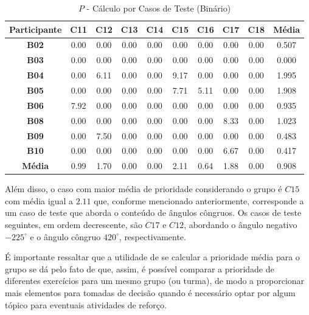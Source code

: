 \begin{table}[htbp]
	\centering
	\caption{$P$ - Cálculo por Casos de Teste (Binário)}
	\begin{tabular}{|c|c|c|c|c|c|c|c|c|c|}
		\hline
		\rowcolor[HTML]{D9D9D9} 
		\cellcolor[HTML]{D0CECE}\textbf{Participante} & \textbf{C11} & \textbf{C12} & \textbf{C13} & \textbf{C14} & \textbf{C15} & \textbf{C16} & \textbf{C17} & \textbf{C18} & \textbf{Média} \\ \hline
		\textbf{B02} & 0.00 & 0.00 & 0.00 & 0.00 & 0.00 & 0.00 & 0.00 & 0.00 & 0.507 \\ \hline
		\rowcolor[HTML]{F2F2F2} 
		\textbf{B03} & 0.00 & 0.00 & 0.00 & 0.00 & 0.00 & 0.00 & 0.00 & 0.00 & 0.000 \\ \hline
		\textbf{B04} & 0.00 & 6.11 & 0.00 & 0.00 & 9.17 & 0.00 & 0.00 & 0.00 & 1.995 \\ \hline
		\rowcolor[HTML]{F2F2F2} 
		\textbf{B05} & 0.00 & 0.00 & 0.00 & 0.00 & 7.71 & 5.11 & 0.00 & 0.00 & 1.908 \\ \hline
		\textbf{B06} & 7.92 & 0.00 & 0.00 & 0.00 & 0.00 & 0.00 & 0.00 & 0.00 & 0.935 \\ \hline
		\rowcolor[HTML]{F2F2F2} 
		\textbf{B08} & 0.00 & 0.00 & 0.00 & 0.00 & 0.00 & 0.00 & 8.33 & 0.00 & 1.023 \\ \hline
		\textbf{B09} & 0.00 & 7.50 & 0.00 & 0.00 & 0.00 & 0.00 & 0.00 & 0.00 & 0.483 \\ \hline
		\rowcolor[HTML]{F2F2F2} 
		\textbf{B10} & 0.00 & 0.00 & 0.00 & 0.00 & 0.00 & 0.00 & 6.67 & 0.00 & 0.417 \\ \hline
		\rowcolor[HTML]{D0CECE} 
		\textbf{Média} & 0.99 & 1.70 & 0.00 & 0.00 & 2.11 & 0.64 & 1.88 & 0.00 & 0.908 \\ \hline
	\end{tabular}
	\label{tab:F3_A2_P_CASOS_BINARIO_}
\end{table}

Além disso, o caso com maior média de prioridade considerando o grupo é $C15$ com média igual a $2.11$ que, conforme mencionado anteriormente, corresponde a um caso de teste que aborda o conteúdo de ângulos côngruos. Os casos de teste seguintes, em ordem decrescente, são $C17$ e $C12$, abordando o ângulo negativo $-225^{\circ}$ e o ângulo côngruo $420^{\circ}$, respectivamente.

É importante ressaltar que a utilidade de se calcular a prioridade média para o grupo se dá pelo fato de que, assim, é possível comparar a prioridade de diferentes exercícios para um mesmo grupo (ou turma), de modo a proporcionar mais elementos para tomadas de decisão quando é necessário optar por algum tópico para eventuais atividades de reforço.

